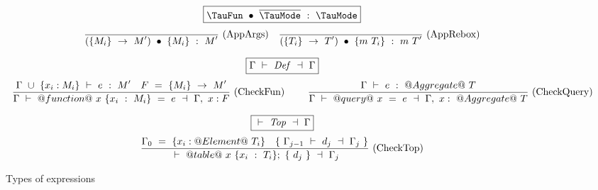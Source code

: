 \begin{figure*}
$$
\boxed{\TypecheckApp{\TauFun}{\ov{\TauMode}}{\TauMode}}
$$
$$
\enskip \frac {\displaystyle 
} {\displaystyle 
  (\{M_i\}~\to~M')~\bullet~\{M_i\}~:~M'
} \  \mbox{(AppArgs)} \enskip
\enskip \frac {\displaystyle 
} {\displaystyle 
  (\{T_i\}~\to~T')~\bullet~\{m~T_i\}~:~m~T'
} \  \mbox{(AppRebox)} \enskip
$$


$$
\boxed{\TypecheckS{\Gamma}{\mi{Def}}{\Gamma}}
$$
$$
\ruleIN
{
  \Typecheck{\Gamma~\cup~\{x_i:M_i\}}{e}{M'}
  \quad
  F~=~\{M_i\}~\to~M'
}
{
  \TypecheckS{\Gamma}{@function@~x~\{x_i~:~M_i\}~=~e}{\Gamma,~x:F}
}{CheckFun}~~~~
\ruleIN
{
  \Typecheck{\Gamma}{e}{@Aggregate@~T}
}
{
  \TypecheckS{\Gamma}{@query@~x~=~e}{\Gamma,~x:~@Aggregate@~T}
}{CheckQuery}
$$


$$
\boxed{\TypecheckS{}{\mi{Top}}{\Gamma}}
$$
$$
\ruleIN
{
  \Gamma_0~=~\{x_i:@Element@~T_i\}
  \quad
  \{~\TypecheckS{\Gamma_{j-1}}{d_j}{\Gamma_j}~\}
}
{
  \TypecheckS
    {}
    {
      @table@
      ~x~\{x_i~:~T_i\};
      ~\{~d_j~\}
    }
    {\Gamma_j}
}{CheckTop}
$$


\caption{Types of expressions}
\label{icicle:fig:source:type:exp}
\end{figure*}

